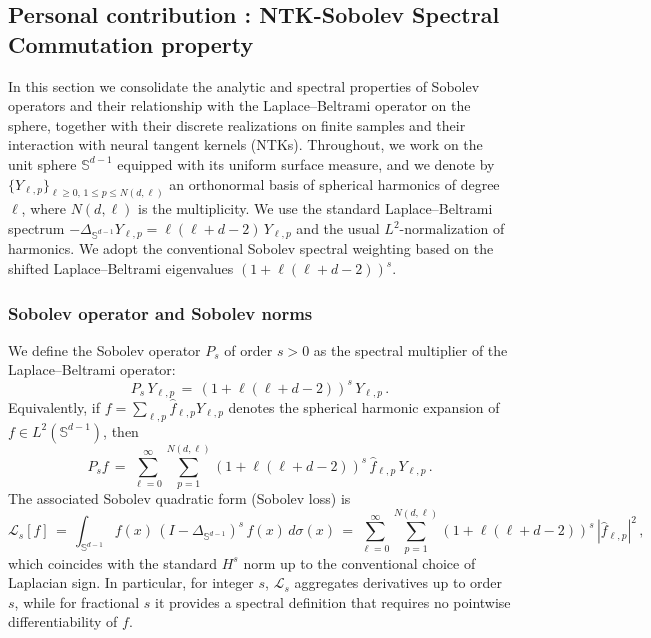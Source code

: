 \documentclass[a4paper]{article}
\begin{document}
\subsection{Personal contribution : NTK-Sobolev Spectral Commutation property}

In this section we consolidate the analytic and spectral properties of Sobolev operators and their relationship with the Laplace--Beltrami operator on the sphere, together with their discrete realizations on finite samples and their interaction with neural tangent kernels (NTKs). Throughout, we work on the unit sphere $\mathbb{S}^{d-1}$ equipped with its uniform surface measure, and we denote by $\{Y_{\ell,p}\}_{\ell \ge 0,\, 1 \le p \le N(d,\ell)}$ an orthonormal basis of spherical harmonics of degree $\ell$, where $N(d,\ell)$ is the multiplicity. We use the standard Laplace--Beltrami spectrum $-\Delta_{\mathbb{S}^{d-1}} Y_{\ell,p} = \ell(\ell+d-2)\,Y_{\ell,p}$ and the usual $L^2$-normalization of harmonics. We adopt the conventional Sobolev spectral weighting based on the shifted Laplace--Beltrami eigenvalues $(1+\ell(\ell+d-2))^s$.

\subsubsection{Sobolev operator and Sobolev norms}

We define the Sobolev operator $P_s$ of order $s>0$ as the spectral multiplier of the Laplace--Beltrami operator:
\[
P_s \, Y_{\ell,p} \,=\, (1+\ell(\ell+d-2))^{s}\, Y_{\ell,p}\,.
\]
Equivalently, if $f = \sum_{\ell,p} \hat f_{\ell,p} Y_{\ell,p}$ denotes the spherical harmonic expansion of $f \in L^2(\mathbb{S}^{d-1})$, then
\[
P_s f \,=\, \sum_{\ell=0}^{\infty} \sum_{p=1}^{N(d,\ell)} (1+\ell(\ell+d-2))^{s}\,\hat f_{\ell,p}\, Y_{\ell,p}\,.
\]
The associated Sobolev quadratic form (Sobolev loss) is
\[
\mathcal{L}_s[f] \,=\, \int_{\mathbb{S}^{d-1}} f(x)\, (I - \Delta_{\mathbb{S}^{d-1}})^{s}\, f(x)\, d\sigma(x) \,=\, \sum_{\ell=0}^{\infty}\sum_{p=1}^{N(d,\ell)} (1+\ell(\ell+d-2))^{s}\, |\hat f_{\ell,p}|^2\,,
\]
which coincides with the standard $H^s$ norm up to the conventional choice of Laplacian sign. In particular, for integer $s$, $\mathcal{L}_s$ aggregates derivatives up to order $s$, while for fractional $s$ it provides a spectral definition that requires no pointwise differentiability of $f$.
\end{document}

